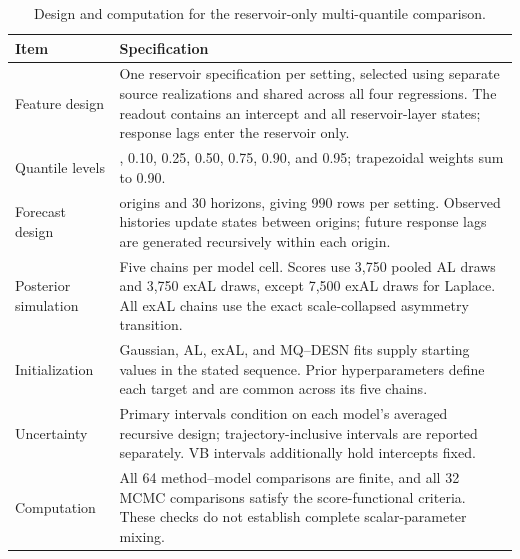 \begin{table}[!htbp]
\centering
\small
\setlength{\tabcolsep}{3pt}
\renewcommand{\arraystretch}{1.08}
\begin{tabular}{@{}>{\raggedright\arraybackslash}p{}>{\raggedright\arraybackslash}p{}@{}}
\toprule
Item & Specification \\
\midrule
Feature design & One reservoir specification per setting, selected using separate source realizations and shared across all four regressions. The readout contains an intercept and all reservoir-layer states; response lags enter the reservoir only. \\
Quantile levels & 0.05, 0.10, 0.25, 0.50, 0.75, 0.90, and 0.95; trapezoidal weights sum to 0.90. \\
Forecast design & 33 origins and 30 horizons, giving 990 rows per setting. Observed histories update states between origins; future response lags are generated recursively within each origin. \\
Posterior simulation & Five chains per model cell. Scores use 3,750 pooled AL draws and 3,750 exAL draws, except 7,500 exAL draws for Laplace. All exAL chains use the exact scale-collapsed asymmetry transition. \\
Initialization & Gaussian, AL, exAL, and MQ--DESN fits supply starting values in the stated sequence. Prior hyperparameters define each target and are common across its five chains. \\
Uncertainty & Primary intervals condition on each model's averaged recursive design; trajectory-inclusive intervals are reported separately. VB intervals additionally hold intercepts fixed. \\
Computation & All 64 method--model comparisons are finite, and all 32 MCMC comparisons satisfy the score-functional criteria. These checks do not establish complete scalar-parameter mixing. \\
\bottomrule
\end{tabular}
\caption{Design and computation for the reservoir-only multi-quantile comparison.}
\label{tab:joint-qdesn-pure-desn-v2-protocol}
\end{table}

